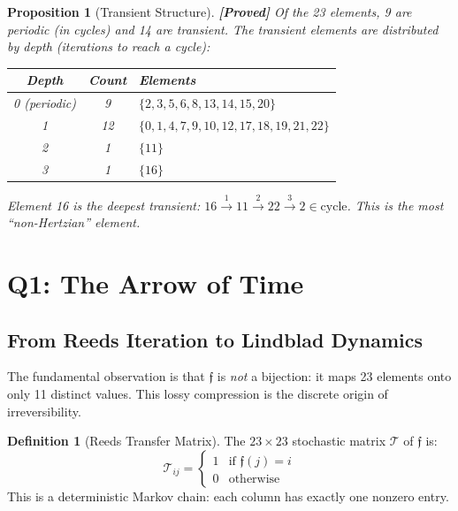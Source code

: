 \documentclass[12pt,a4paper]{article}
\newcommand{\proved}[1]{\textcolor{proved}{\textbf{[Proved]}} #1}
\newtheorem{proposition}[theorem]{Proposition}
\theoremstyle{definition}
\newtheorem{definition}[theorem]{Definition}
\theoremstyle{remark}
\newcommand{\Reeds}{\mathfrak{f}}
\begin{document}
\begin{proposition}[Transient Structure]
\label{prop:transient}
\proved{Of the 23 elements, 9 are periodic (in cycles) and 14 are transient.}
The transient elements are distributed by depth (iterations to reach a cycle):
\begin{center}
\begin{tabular}{ccl}
\toprule
\textbf{Depth} & \textbf{Count} & \textbf{Elements} \\
\midrule
0 (periodic) & 9 & $\{2,3,5,6,8,13,14,15,20\}$ \\
1 & 12 & $\{0,1,4,7,9,10,12,17,18,19,21,22\}$ \\
2 & 1 & $\{11\}$ \\
3 & 1 & $\{16\}$ \\
\bottomrule
\end{tabular}
\end{center}
Element 16 is the \emph{deepest transient}: $16 \xrightarrow{1} 11 \xrightarrow{2} 22 \xrightarrow{3} 2 \in \text{cycle}$. This is the most ``non-Hertzian'' element.
\end{proposition}

\section{Q1: The Arrow of Time}
\label{sec:arrow}

\subsection{From Reeds Iteration to Lindblad Dynamics}

The fundamental observation is that $\Reeds$ is \emph{not} a bijection: it maps
23 elements onto only 11 distinct values. This lossy compression is the discrete
origin of irreversibility.

\begin{definition}[Reeds Transfer Matrix]
\label{def:transfer}
The $23 \times 23$ stochastic matrix $\mathcal{T}$ of $\Reeds$ is:
\begin{equation}
  \mathcal{T}_{ij} = \begin{cases} 1 & \text{if } \Reeds(j) = i \\ 0 & \text{otherwise} \end{cases}
\end{equation}
This is a deterministic Markov chain: each column has exactly one nonzero entry.
\end{definition}
\end{document}
